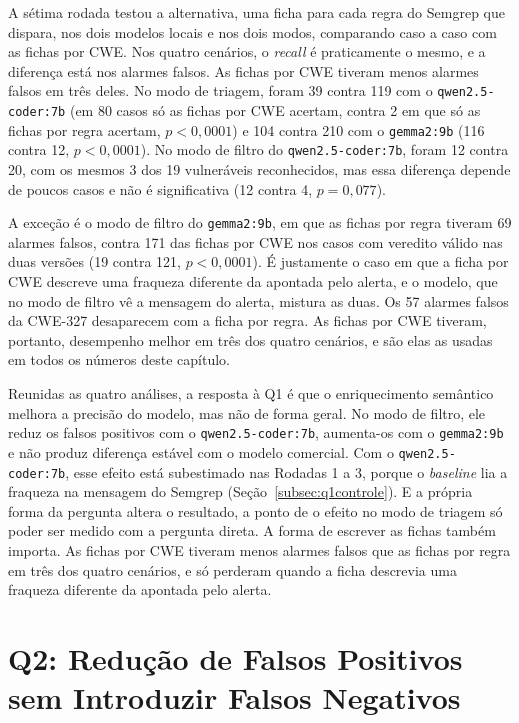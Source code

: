 A sétima rodada testou a alternativa, uma ficha para cada regra do Semgrep que dispara, nos dois modelos locais e nos dois modos, comparando caso a caso com as fichas por CWE. Nos quatro cenários, o \textit{recall} é praticamente o mesmo, e a diferença está nos alarmes falsos. As fichas por CWE tiveram menos alarmes falsos em três deles. No modo de triagem, foram 39 contra 119 com o \texttt{qwen2.5-coder:7b} (em 80 casos só as fichas por CWE acertam, contra 2 em que só as fichas por regra acertam, $p < 0{,}0001$) e 104 contra 210 com o \texttt{gemma2:9b} (116 contra 12, $p < 0{,}0001$). No modo de filtro do \texttt{qwen2.5-coder:7b}, foram 12 contra 20, com os mesmos 3 dos 19 vulneráveis reconhecidos, mas essa diferença depende de poucos casos e não é significativa (12 contra 4, $p = 0{,}077$).

A exceção é o modo de filtro do \texttt{gemma2:9b}, em que as fichas por regra tiveram 69 alarmes falsos, contra 171 das fichas por CWE nos casos com veredito válido nas duas versões (19 contra 121, $p < 0{,}0001$). É justamente o caso em que a ficha por CWE descreve uma fraqueza diferente da apontada pelo alerta, e o modelo, que no modo de filtro vê a mensagem do alerta, mistura as duas. Os 57 alarmes falsos da CWE-327 desaparecem com a ficha por regra. As fichas por CWE tiveram, portanto, desempenho melhor em três dos quatro cenários, e são elas as usadas em todos os números deste capítulo.

Reunidas as quatro análises, a resposta à Q1 é que o enriquecimento semântico melhora a precisão do modelo, mas não de forma geral. No modo de filtro, ele reduz os falsos positivos com o \texttt{qwen2.5-coder:7b}, aumenta-os com o \texttt{gemma2:9b} e não produz diferença estável com o modelo comercial. Com o \texttt{qwen2.5-coder:7b}, esse efeito está subestimado nas Rodadas 1 a 3, porque o \textit{baseline} lia a fraqueza na mensagem do Semgrep (Seção~\ref{subsec:q1controle}). E a própria forma da pergunta altera o resultado, a ponto de o efeito no modo de triagem só poder ser medido com a pergunta direta. A forma de escrever as fichas também importa. As fichas por CWE tiveram menos alarmes falsos que as fichas por regra em três dos quatro cenários, e só perderam quando a ficha descrevia uma fraqueza diferente da apontada pelo alerta.

\section{Q2: Redução de Falsos Positivos sem Introduzir Falsos Negativos}
\label{sec:q2}

